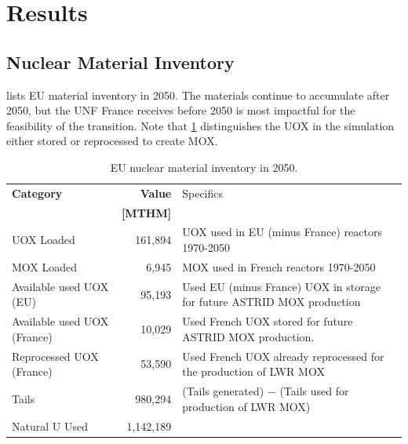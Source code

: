 \section{Results}

\subsection{Nuclear Material Inventory}

lists \gls{EU} material inventory in 2050.
The materials continue to accumulate after 2050, but the
\gls{UNF} France receives before 2050 is most impactful for the
feasibility of the transition. Note that \cref{tab:sim_result1} 
distinguishes the
\gls{UOX} in the simulation either stored or reprocessed to create \gls{MOX}.


\begin{table}[h]
	\centering
        \caption{\gls{EU} nuclear material inventory in 2050.}
\begin{tabularx}{\textwidth}{XrX}
			\hline
                        \textbf{Category} & \textbf{Value} & Specifics \\
                                          & \textbf{[MTHM]} & \\ \hline
                        UOX Loaded  & 161,894 & UOX used in EU (minus France) reactors 1970-2050\\ 
			MOX Loaded  & 6,945  & MOX used in French reactors 1970-2050\\
                        Available used UOX (EU)  & 95,193  & Used EU (minus France) 
                                UOX in storage for future ASTRID MOX 
                                production\\
                        Available used UOX (France) & 
                                10,029  & Used French UOX stored for 
                                future ASTRID MOX production. \\
                                Reprocessed UOX (France) & 53,590 & Used French UOX already reprocessed for the production of LWR MOX \\
			Tails  & 980,294  & (Tails generated) $-$ (Tails used for production of LWR MOX) \\ 
			Natural U Used  & 1,142,189  & \\ \hline
		\end{tabularx}
		
		\label{tab:sim_result1}
\end {table}
\FloatBarrier


